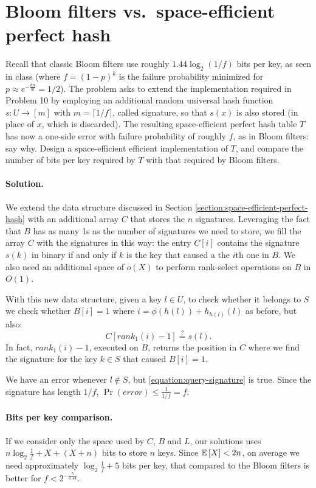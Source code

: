 \section{Bloom filters vs.\ space-efficient perfect hash}

Recall that classic Bloom filters use roughly $1.44\log_2(1/f)$ bits per key, as
seen in class (where $f=(1-p)^k$ is the failure probability minimized for
$p \approx e^{-\frac{kn}{m}} = 1/2$).
The problem asks to extend the implementation required in Problem 10 by employing
an additional random universal hash function $s : U \to [m]$ with $m = \lceil 1/f \rceil$,
called signature, so that $s(x)$ is also stored (in place of $x$, which is discarded).
The resulting space-efficient perfect hash table $T$ has now a one-side error with
failure probability of roughly $f$, as in Bloom filters: say why.
Design a space-efficient efficient implementation of $T$, and compare the number
of bits per key required by $T$ with that required by Bloom filters.

\vspace{0.5cm}
\paragraph{Solution.}
We extend the data structure discussed in Section \ref{section:space-efficient-perfect-hash} with an additional array $C$ that stores the $n$ signatures. Leveraging the fact that $B$ has as many 1s as the number of signatures we need to store, we fill the array $C$ with the signatures in this way: the entry $C[i]$ contains the signature $s(k)$ in binary if and only if $k$ is the key that caused a the $i$th one in $B$. We also need an additional space of $o(X)$ to perform rank-select operations  on $B$ in $O(1)$.

With this new data structure, given a key $l \in U$, to check whether it belongs to $S$ we check whether $B[i]=1$ where $i=\phi(h(l))+h_{h(l)}(l)$ as before, but also:
\begin{equation}
  \label{equation:query-signature}
  C[rank_1(i)-1] \stackrel{?}{=} s(l).
\end{equation}
In fact, $rank_1(i)-1$, executed on $B$, returns the position in $C$ where we find the signature for the key $k\in S$ that caused $B[i]=1$.

We have an error whenever $l\notin S$, but \eqref{equation:query-signature} is true. Since the signature has length $1/f$, $\Pr(error) \leq \frac{1}{1/f} = f$.

\paragraph{Bits per key comparison.} If we consider only the space used by $C$, $B$ and $L$, our solutions uses $n\log_2\frac{1}{f}+X+(X+n)$ bits to store $n$ keys. Since $\mathbb{E}\left[{X}\right]<2n$, on average we need approximately $\log_2\frac{1}{f}+5$ bits per key, that compared to the Bloom filters is better for $f<2^{-\frac{5}{0.44}}$.
